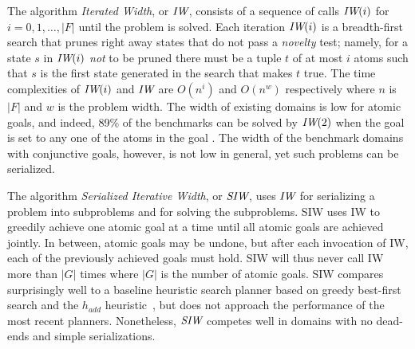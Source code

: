 
The algorithm  \emph{Iterated Width},  or ${\textit{IW}}$,
consists  of a sequence of calls ${\textit{IW}}(i)$ for $i=0,1,\ldots, |F|$
until the problem is solved. Each iteration ${\textit{IW}}(i)$ is a 
breadth-first search that prunes right away  states  that do not pass a   \emph{novelty} test; 
namely, for a state $s$ in ${\textit{IW}}(i)$ \emph{not} to be pruned there must be 
a tuple $t$ of at most $i$ atoms such that $s$ is the first state 
generated in the search that makes $t$ true. The time complexities of ${\textit{IW}}(i)$ and ${\textit{IW}}$
are  $O(n^i)$ and $O(n^w)$ respectively  where $n$ is $|F|$ and $w$ is the problem width.
The width of existing domains is low for atomic goals,  and indeed,  89\% of the  benchmarks
can be solved by ${\textit{IW}}(2)$ when the goal is set to any one of the atoms in the goal \cite{nir:ecai12}.
The width of the benchmark domains with conjunctive goals, however, is not low in general,
yet such problems can be serialized.


The algorithm \emph{Serialized Iterative Width}, or ${\textit{SIW}}$, uses ${\textit{IW}}$
for serializing a problem into subproblems and for solving the
subproblems.  SIW uses IW to greedily achieve one atomic goal at a
time until all atomic goals are achieved jointly. In
between, atomic goals may be undone, but after each invocation of IW,
each of the previously achieved goals must hold. SIW will thus never
call IW more than $|G|$ times where $|G|$ is the number of atomic
goals. SIW compares surprisingly well to a baseline heuristic search
planner based on greedy best-first search and the $h_{add}$
heuristic~\cite{bonet:aij-hsp}, but does not approach the performance
of the most recent planners. Nonetheless, ${\textit{SIW}}$ competes well in
domains with no dead-ends and simple serializations.
